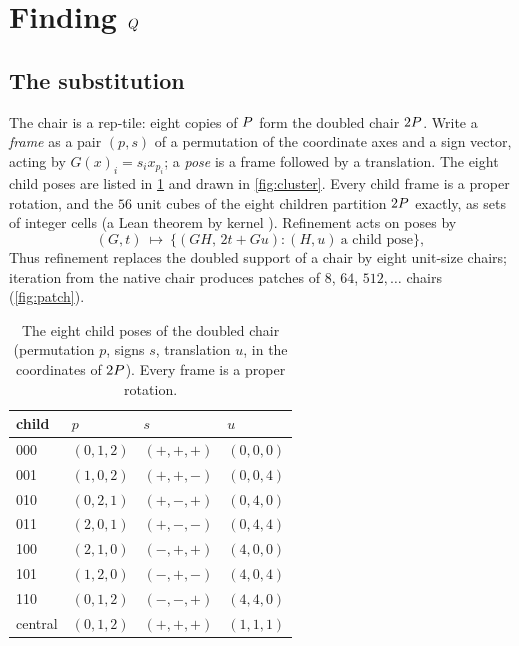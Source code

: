 \section{Finding \texorpdfstring{$Q$}{Q}}\label{sec:finding}

\subsection{The substitution}\label{sec:substitution}

The chair is a rep-tile: eight copies of $P$ form the doubled chair $2P$. Write a
\emph{frame} as a pair $(p,s)$ of a permutation of the coordinate axes and a sign vector, acting
by $G(x)_i=s_i x_{p_i}$; a \emph{pose} is a frame followed by a translation. The eight child poses
are listed in \cref{tab:children} and drawn in \cref{fig:cluster}. Every child frame is a proper
rotation, and the $56$ unit cubes of the eight children partition $2P$ exactly, as sets of
integer cells (a Lean theorem by kernel ). Refinement acts on poses by
\[
  (G,t)\ \longmapsto\ \{(GH,\,2t+Gu) : (H,u)\ \text{a child pose}\},
\]
Thus refinement replaces the doubled support of a chair by eight unit-size chairs; iteration from
the native chair produces patches of $8$, $64$, $512,\dots$ chairs (\cref{fig:patch}).

\begin{table}[ht]
  \centering
  \caption{The eight child poses of the doubled chair (permutation $p$, signs $s$, translation
  $u$, in the coordinates of $2P$). Every frame is a proper rotation.}
  \label{tab:children}
  \begin{tabular}{llll}
    \toprule
    child & $p$ & $s$ & $u$ \\
    \midrule
    000 & $(0,1,2)$ & $(+,+,+)$ & $(0,0,0)$ \\
    001 & $(1,0,2)$ & $(+,+,-)$ & $(0,0,4)$ \\
    010 & $(0,2,1)$ & $(+,-,+)$ & $(0,4,0)$ \\
    011 & $(2,0,1)$ & $(+,-,-)$ & $(0,4,4)$ \\
    100 & $(2,1,0)$ & $(-,+,+)$ & $(4,0,0)$ \\
    101 & $(1,2,0)$ & $(-,+,-)$ & $(4,0,4)$ \\
    110 & $(0,1,2)$ & $(-,-,+)$ & $(4,4,0)$ \\
    central & $(0,1,2)$ & $(+,+,+)$ & $(1,1,1)$ \\
    \bottomrule
  \end{tabular}
\end{table}

